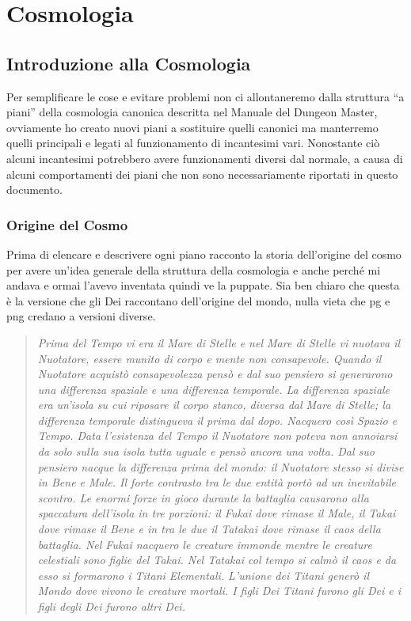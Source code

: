 \documentclass[a4paper]{report}
\begin{document}
\part{Cosmologia}
\begin{multicols}{2}
\chapter{Introduzione alla Cosmologia}
 Per semplificare le cose e evitare problemi non ci allontaneremo dalla struttura \enquote{a piani} della cosmologia canonica descritta nel Manuale del Dungeon Master, ovviamente ho creato nuovi piani a sostituire quelli canonici ma manterremo quelli principali e legati al funzionamento di incantesimi vari. Nonostante ciò alcuni incantesimi potrebbero avere funzionamenti diversi dal normale, a causa di alcuni comportamenti dei piani che non sono necessariamente riportati in questo documento.
\section{Origine del Cosmo}
Prima di elencare e descrivere ogni piano racconto la storia dell'origine del cosmo per avere un'idea generale della struttura della cosmologia e anche perché mi andava e ormai l'avevo inventata quindi ve la puppate. Sia ben chiaro che questa è la versione che gli Dei raccontano dell'origine del mondo, nulla vieta che pg e png credano a versioni diverse. 
\\
\begin{verse}
\textit{Prima del Tempo vi era il Mare di Stelle e nel Mare di Stelle vi nuotava il Nuotatore, essere munito di corpo e mente non consapevole.
Quando il Nuotatore acquistò consapevolezza pensò e dal suo pensiero si generarono una differenza spaziale e una differenza temporale. La differenza spaziale era un'isola su cui riposare il corpo stanco, diversa dal Mare di Stelle; la differenza temporale distingueva il prima dal dopo. Nacquero così Spazio e Tempo. Data l'esistenza del Tempo il Nuotatore non poteva non annoiarsi da solo sulla sua isola tutta uguale e pensò ancora una volta. Dal suo pensiero nacque la differenza prima del mondo: il Nuotatore stesso si divise in Bene e Male. Il forte contrasto tra le due entità portò ad un inevitabile scontro. Le enormi forze in gioco durante la battaglia causarono alla spaccatura dell'isola in tre porzioni: il Fukai dove rimase il Male, il Takai dove rimase il Bene e in tra le due il Tatakai dove rimase il caos della battaglia. Nel Fukai nacquero le creature immonde mentre le creature celestiali sono figlie del Takai.
Nel Tatakai col tempo si calmò il caos e da esso si formarono i Titani Elementali. L'unione dei Titani generò il Mondo dove vivono le creature mortali. I figli Dei Titani furono gli Dei e i figli degli Dei furono altri Dei.}
\end{verse}
\vspace{0.5cm}

\end{multicols}
\end{document}
